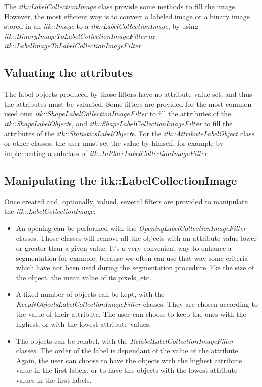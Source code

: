 \documentclass{InsightArticle}
\begin{document}
The {\em itk::LabelCollectionImage} class provide some methods to fill the
image. However, the most efficient way is to convert a labeled image or a binary
image stored in an {\em itk::Image} to a {\em itk::LabelCollectionImage}, by
using {\em itk::BinaryImageToLabelCollectionImageFilter} or {\em
itk::LabelImageToLabelCollectionImageFilter}.

\subsection{Valuating the attributes}

The label objects produced by those filters have no attribute value set, and
thus the attributes must be valuated. Some filters are provided for the most
common used one: {\em itk::ShapeLabelCollectionImageFilter} to fill the
attributes of the {\em itk::ShapeLabelObject}s, and {\em
itk::ShapeLabelCollectionImageFilter} to fill the attributes of the {\em
itk::StatisticsLabelObject}s. For the {\em itk::AttributeLabelObject} class or
other classes, the user must set the value by himself, for example by
implementing a subclass of {\em itk::InPlaceLabelCollectionImageFilter}.

\subsection{Manipulating the itk::LabelCollectionImage}

Once created and, optionally, valued, several filters are provided to manipulate
the {\em itk::LabelCollectionImage}:

\begin{itemize}
  \item An opening can be performed with the {\em
OpeningLabelCollectionImageFilter} classes. Those classes will remove all the
objects with an attribute value lower or greater than a given value. It's a very
convenient way to enhance a segmentation for example, because we often can use
that way some criteria  which have not been used during the segmentation
procedure, like the size of the object, the mean value of its pixels, etc.
  \item A fixed number of objects can be kept, with the {\em
KeepNObjectsLabelCollectionImageFilter} classes. They are chosen according to
the value of their attribute. The user can choose to keep the ones with the
highest, or with the lowest attribute values.
  \item The objects can be relabel, with the {\em
RelabelLabelCollectionImageFilter} classes. The order of the label is dependant
of the value of the attribute. Again, the user can choose to have the objects
with the highest attribute value in the first labels, or to have the objects
with the lowest attribute values in the first labels.
\end{itemize}
\end{document}
